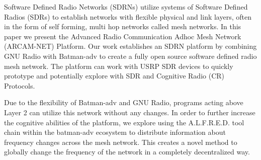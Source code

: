 
Software Defined Radio Networks (SDRNs) utilize systems of Software Defined Radios (SDRs) to establish networks with flexible physical and link layers, often in the form of self forming, multi hop networks called mesh networks. In this paper we present the Advanced Radio Communication Adhoc Mesh Network (ARCAM-NET) Platform. Our work establishes an SDRN platform by combining GNU Radio with Batman-adv to create a fully open source software defined radio mesh network. The platform can work with USRP SDR devices to quickly prototype and potentially explore with SDR and Cognitive Radio (CR) Protocols. 

Due to the flexibility of Batman-adv and GNU Radio, programs acting above Layer 2 can utilize this network without any changes. In order to further increase the cognitive abilities of the platform, we explore using the A.L.F.R.E.D. tool chain within the batman-adv ecosystem to distribute information about frequency changes across the mesh network. This creates a novel method to globally change the frequency of the network in a completely decentralized way. 

